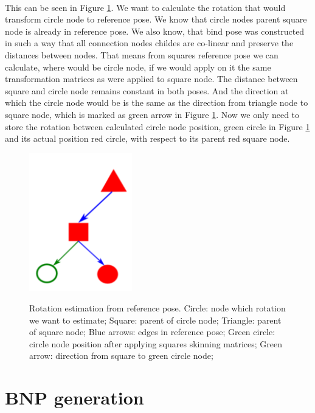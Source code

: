 \paragraph{}
This can be seen in Figure \ref{fig:DoF_estimation_ilu}. We want to calculate the rotation that would transform circle node to reference pose. We know that circle nodes parent square node is already in reference pose. We also know, that bind pose was constructed in such a way that all connection nodes childes are co-linear and preserve the distances between nodes. That means from squares reference pose we can calculate, where would be circle node, if we would apply on it the same transformation matrices as were applied to square node. The distance between square and circle node remains constant in both poses. And the direction at which the circle node would be is the same as the direction from triangle node to square node, which is marked as green arrow in Figure \ref{fig:DoF_estimation_ilu}. Now we only need to store the rotation between calculated circle node position, green circle in Figure \ref{fig:DoF_estimation_ilu} and its actual position red circle, with respect to its parent red square node.

\begin{figure}[h]
    \centering
    \includegraphics[height=6cm]{images/DoF_estimation.png}
    \label{fig:DoF_estimation_ilu}
    \caption[Rotation estimation from reference pose]{Rotation estimation from reference pose. Circle: node which rotation we want to estimate; Square: parent of circle node; Triangle: parent of square node; Blue arrows: edges in reference pose; Green circle: circle node position after applying squares skinning matrices; Green arrow: direction from square to green circle node;}
\end{figure}

\section{BNP generation}
